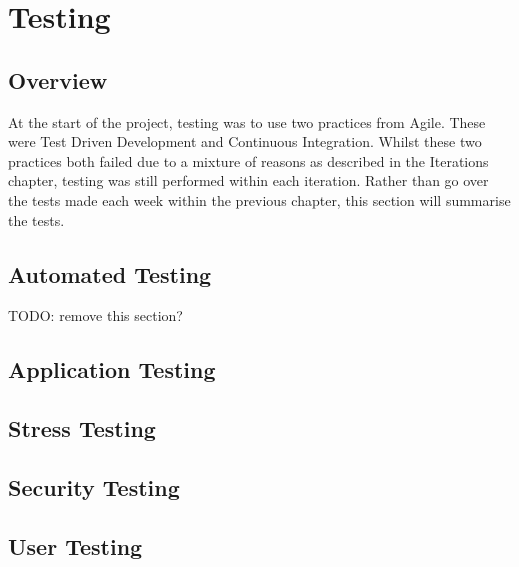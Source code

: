 \chapter{Testing}

\section{Overview}
At the start of the project, testing was to use two practices from Agile. These were Test Driven Development and Continuous Integration. Whilst these two practices both failed due to a mixture of reasons as described in the Iterations chapter, testing was still performed within each iteration. Rather than go over the tests made each week within the previous chapter, this section will summarise the tests. 

\section{Automated Testing}
TODO: remove this section?

\section{Application Testing}

\section{Stress Testing}

\section{Security Testing}

\section{User Testing}